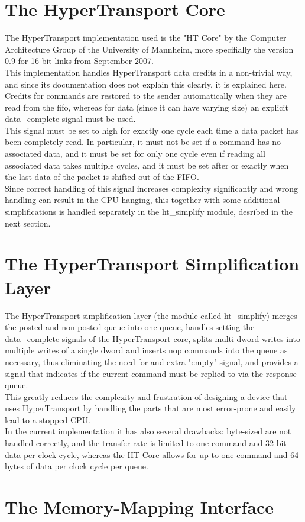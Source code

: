 \section{The HyperTransport Core}

The HyperTransport implementation used is the "HT Core" by the Computer
Architecture Group of the University of Mannheim, more specifially the
version 0.9 for 16-bit links from September 2007.\\
This implementation handles HyperTransport data credits in a non-trivial
way, and since its documentation does not explain this clearly, it is
explained here.\\
Credits for commands are restored to the sender automatically when they are
read from the fifo, whereas for data (since it can have varying size) an
explicit data\_complete signal must be used.\\
This signal must be set to high for exactly one cycle each time a data packet
has been completely read. In particular, it must not be set if a command
has no associated data, and it must be set for only one cycle even if reading
all associated data takes multiple cycles, and it must be set after or
exactly when the last data of the packet is shifted out of the FIFO.\\
Since correct handling of this signal increases complexity significantly
and wrong handling can result in the CPU hanging, this together with some
additional simplifications is handled separately in the ht\_simplify module,
desribed in the next section.

\section{The HyperTransport Simplification Layer}

The HyperTransport simplification layer (the module called ht\_simplify)
merges the posted and non-posted queue into one queue, handles setting
the data\_complete signals of the HyperTransport core, splits multi-dword
writes into multiple writes of a single dword and inserts nop
commands into the queue as necessary, thus eliminating the need for
and extra "empty" signal, and provides a signal that indicates
if the current command must be replied to via the response queue.\\
This greatly reduces the complexity and frustration of designing a device
that uses HyperTransport by handling the parts that are most error-prone
and easily lead to a stopped CPU.\\
In the current implementation it has also several drawbacks: byte-sized
are not handled correctly, and the transfer rate is limited to one command
and 32 bit data per clock cycle, whereas the HT Core allows for up to one
command and 64 bytes of data per clock cycle per queue.\\

\section{The Memory-Mapping Interface}
